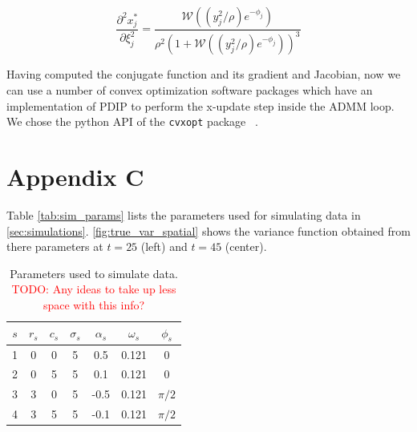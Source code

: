 \documentclass{article}
\newcommand{\attn}[1]{\textcolor{red}{TODO: #1}}
\begin{document}
\begin{equation}
\frac{\partial^2 x_j^*}{\partial \xi_j^2}  = \frac{\mathscr{W}((y_j^2/\rho) e^{-\phi_j} )}{\rho^2(1+\mathscr{W}((y_j^2/\rho) e^{-\phi_j} ))^3}
\label{eq:d2_x*_start}
\end{equation}

Having computed the conjugate function and its gradient and Jacobian, now we can use a number of convex optimization software packages which have an implementation of PDIP to perform the x-update step inside the ADMM loop. We chose the python API of the \texttt{cvxopt} package ~\citep{andersen_cvxopt:_2013}. 

\section{Appendix C}
Table \autoref{tab:sim_params} lists the parameters used for simulating data in \autoref{sec:simulations}. \autoref{fig:true_var_spatial} shows the variance function obtained from there parameters at $t=25$ (left) and $t=45$ (center).

\begin{table}[tb]
  \caption{Parameters used to simulate data. \attn{Any ideas to take
      up less space with this info?}}
  \label{tab:sim_params}
  \begin{center}
    \begin{tabular}{ccccccc}
      \hline
      $s$ & $r_s$ & $c_s$ & $\sigma_s$ &$\alpha_s$ & $\omega_s$ & $\phi_s$\\
      \hline
      1 & 0 & 0 & 5 & 0.5 & 0.121 & 0 \\
      2 & 0 & 5 & 5 & 0.1 & 0.121 & 0 \\
      3 & 3 & 0 & 5 & -0.5 & 0.121 & $\pi/2$ \\
      4 & 3 & 5 & 5 & -0.1 & 0.121 & $\pi/2$ \\
      \hline
    \end{tabular}
  \end{center}
\end{table} 
\end{document}
